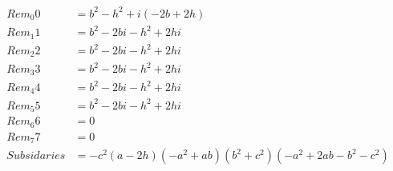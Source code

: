 \documentclass{jsarticle}
\begin{document}
\begin{align}
Rem_{0}0 &= b^{2} - h^{2} + i \left(- 2 b + 2 h\right) \\
Rem_{1}1 &= b^{2} - 2 b i - h^{2} + 2 h i \\
Rem_{2}2 &= b^{2} - 2 b i - h^{2} + 2 h i \\
Rem_{3}3 &= b^{2} - 2 b i - h^{2} + 2 h i \\
Rem_{4}4 &= b^{2} - 2 b i - h^{2} + 2 h i \\
Rem_{5}5 &= b^{2} - 2 b i - h^{2} + 2 h i \\
Rem_{6}6 &= 0 \\
Rem_{7}7 &= 0 \\
Subsidaries &= - c^{2} \left(a - 2 h\right) \left(- a^{2} + a b\right) \left(b^{2} + c^{2}\right) \left(- a^{2} + 2 a b - b^{2} - c^{2}\right) 
\end{align}
\end{document}
